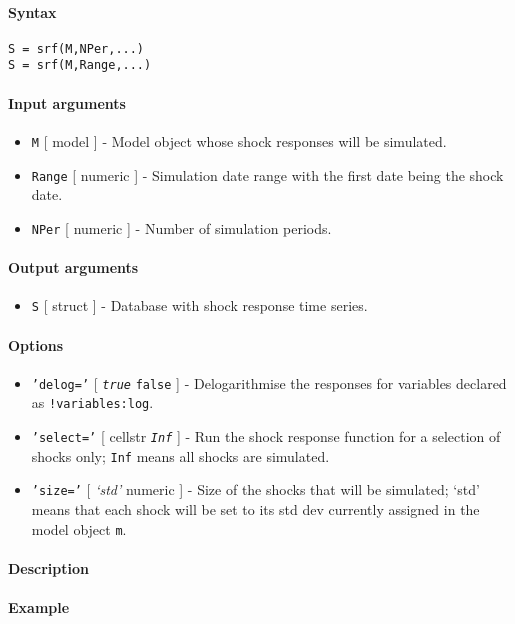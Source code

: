 


	\paragraph{Syntax}

\begin{verbatim}
S = srf(M,NPer,...)
S = srf(M,Range,...)
\end{verbatim}

\paragraph{Input arguments}

\begin{itemize}
\item
  \texttt{M} {[} model {]} - Model object whose shock responses will be
  simulated.
\item
  \texttt{Range} {[} numeric {]} - Simulation date range with the first
  date being the shock date.
\item
  \texttt{NPer} {[} numeric {]} - Number of simulation periods.
\end{itemize}

\paragraph{Output arguments}

\begin{itemize}
\itemsep1pt\parskip0pt
\item
  \texttt{S} {[} struct {]} - Database with shock response time series.
\end{itemize}

\paragraph{Options}

\begin{itemize}
\item
  \texttt{'delog='} {[} \emph{\texttt{true}} \textbar{} \texttt{false}
  {]} - Delogarithmise the responses for variables declared as
  \texttt{!variables:log}.
\item
  \texttt{'select='} {[} cellstr \textbar{} \emph{\texttt{Inf}} {]} -
  Run the shock response function for a selection of shocks only;
  \texttt{Inf} means all shocks are simulated.
\item
  \texttt{'size='} {[} \emph{`std'} \textbar{} numeric {]} - Size of the
  shocks that will be simulated; `std' means that each shock will be set
  to its std dev currently assigned in the model object \texttt{m}.
\end{itemize}

\paragraph{Description}

\paragraph{Example}



